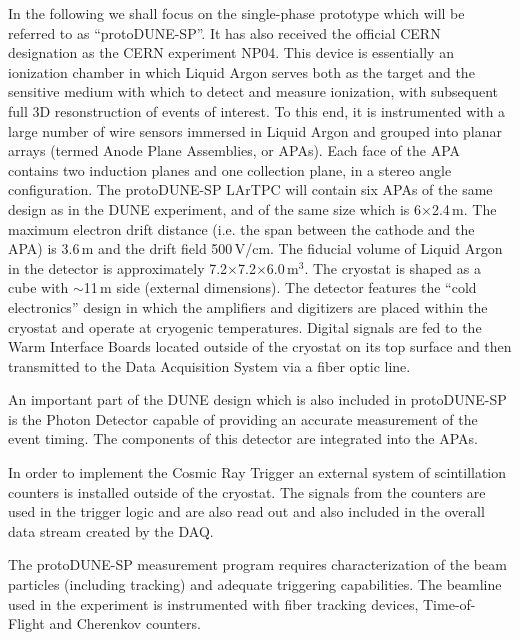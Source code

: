 \documentclass{PoS}
\newcommand{\pd}{protoDUNE\xspace}
\begin{document}
In the following we shall focus on the single-phase prototype which will be referred to as ``protoDUNE-SP''.
It has also received the official CERN designation as the CERN experiment NP04.
This device is essentially an ionization chamber in which Liquid Argon serves both as the target and
the sensitive medium with which to detect and measure ionization, with subsequent full 3D resonstruction of
events of interest. To this end, it is instrumented with a large number
of wire sensors immersed in Liquid Argon and grouped into planar arrays (termed Anode Plane Assemblies, or APAs).
Each face of the APA contains
two induction planes and one collection plane, in a stereo angle configuration.
The \pd-SP LArTPC will contain six APAs of the same design as in the DUNE
experiment, and of the same size which is 6$\times$2.4\,m. The maximum electron drift distance (i.e. the span between
the cathode and the APA) is 3.6\,m
and the drift field 500\,V/cm. The fiducial volume of Liquid Argon in the detector
is approximately 7.2$\times$7.2$\times$6.0\,m$^3$. The cryostat is shaped as a cube
with $\sim$11\,m side (external dimensions).
The detector features the ``cold electronics'' design
in which the amplifiers and digitizers are placed within the cryostat and operate at
cryogenic temperatures. Digital signals are fed to the Warm Interface Boards located
outside of the cryostat on its top surface and then transmitted to the Data Acquisition
System via a fiber optic line.

An important part of the DUNE design which is also included in \pd-SP is the Photon Detector capable
of providing an accurate measurement of the event timing. The components of this detector are integrated
into the APAs.

In order to implement the Cosmic Ray Trigger an external system of scintillation counters is installed
outside of the cryostat. The signals from the counters are used in the trigger logic and are also
read out and also included in the overall data stream created by the DAQ.

The \pd-SP measurement program requires characterization of the beam particles (including tracking) and adequate triggering
capabilities. The beamline used in the experiment is instrumented with fiber tracking devices, Time-of-Flight and
Cherenkov counters.



\end{document}
